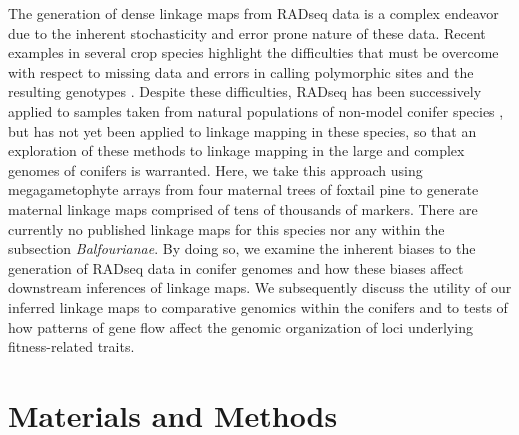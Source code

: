\documentclass[11pt]{article}
\begin{document}
The generation of dense linkage maps from RADseq data is a complex endeavor due to the inherent stochasticity
and error prone nature of these data. Recent examples in several crop species highlight the
difficulties that must be overcome with respect to missing data and errors in calling polymorphic sites 
and the resulting genotypes \citep{Pfender:2011, Ward:2013}. Despite these difficulties, RADseq has been 
successively applied to samples taken from natural populations of non-model conifer species \citep{Parchman:2012}, but has not yet 
been applied to linkage mapping in these species, so that an exploration of these methods to linkage mapping in the large and complex 
genomes of conifers is warranted. Here, we take this approach using megagametophyte arrays from four maternal trees of foxtail pine
to generate maternal linkage maps comprised of tens of thousands of markers. There are currently no published linkage 
maps for this species nor any within the subsection \textit{Balfourianae}. By doing so, we examine the inherent biases
to the generation of RADseq data in conifer genomes and how these biases affect downstream inferences of linkage maps. We subsequently discuss
the utility of our inferred linkage maps to comparative genomics within the conifers and to tests of how patterns of gene flow 
affect the genomic organization of loci underlying fitness-related traits.


\section*{Materials and Methods}
\end{document}
